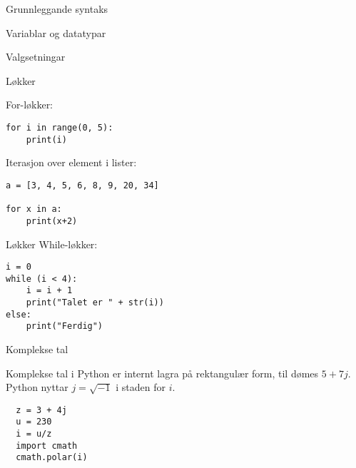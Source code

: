 
\begin{frame}{Grunnleggande syntaks}
  
\end{frame}

\begin{frame}{Variablar og datatypar}
  
\end{frame}

\begin{frame}{Valgsetningar}
  
\end{frame}

\begin{frame}[containsverbatim]{Løkker}

For-løkker:

\begin{verbatim}
for i in range(0, 5):
	print(i)
\end{verbatim}

Iterasjon over element i lister:

\begin{verbatim}
a = [3, 4, 5, 6, 8, 9, 20, 34]

for x in a:
	print(x+2)
\end{verbatim}
  
\end{frame}

\begin{frame}[containsverbatim]{Løkker}
	While-løkker:
	
\begin{verbatim}
i = 0
while (i < 4):
	i = i + 1
	print("Talet er " + str(i))
else:
	print("Ferdig")
\end{verbatim}
	
\end{frame}

\begin{frame}[containsverbatim]{Komplekse tal}

  Komplekse tal i Python er internt lagra på rektangulær form, til dømes \(5 + 7j\). Python nyttar \(j = \sqrt{-1}\) i staden for \(i\).

\begin{verbatim}
  z = 3 + 4j
  u = 230
  i = u/z
  import cmath
  cmath.polar(i)
\end{verbatim}
  
\end{frame}

